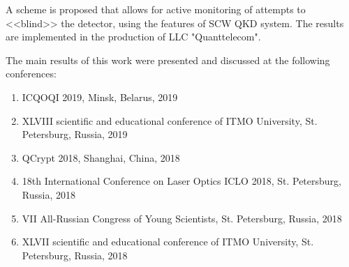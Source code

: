 {\implementation} A scheme is proposed that allows for active monitoring of attempts to <<blind>> the detector, using the features of SCW QKD system. The results are implemented in the production of LLC "Quanttelecom".

{\approbation} The main results of this work were presented and discussed at the following conferences:
\begin{enumerate}
	\item ICQOQI 2019, Minsk, Belarus, 2019
	\item XLVIII scientific and educational conference of ITMO University, St. Petersburg, Russia, 2019
	\item QCrypt 2018, Shanghai, China, 2018
	\item 18th International Conference on Laser Optics ICLO 2018, St. Petersburg, Russia, 2018
	\item VII All-Russian Congress of Young Scientists, St. Petersburg, Russia, 2018
	\item XLVII scientific and educational conference of ITMO University, St. Petersburg, Russia, 2018
\end{enumerate}



